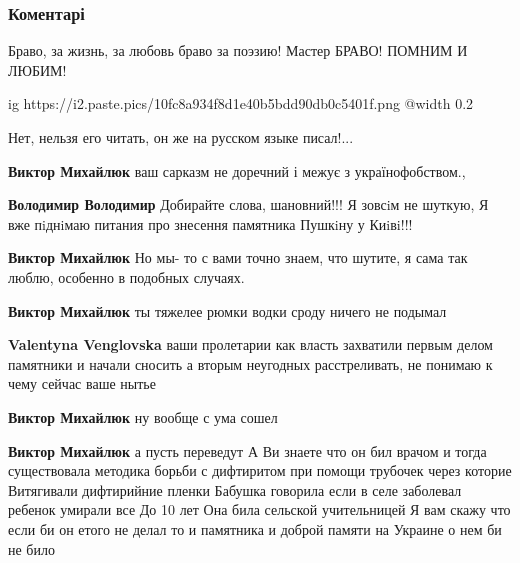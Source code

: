  
 
 
 
 
\subsubsection{Коментарі}

\begin{itemize} %
Браво, за жизнь, за любовь браво за поэзию! Мастер БРАВО! ПОМНИМ И ЛЮБИМ!

\ifcmt
  ig https://i2.paste.pics/10fc8a934f8d1e40b5bdd90db0c5401f.png
  @width 0.2
\fi

Нет, нельзя его читать, он же на русском языке писал!...

\begin{itemize} %
\textbf{Виктор Михайлюк} ваш сарказм не доречний і межує з українофобством.,

\begin{itemize} %
\textbf{Володимир Володимир} Добирайте слова, шановний!!! Я зовсiм не шуткую, Я вже пiднiмаю питания про знесення памятника Пушкiну у Киiвi!!!

\textbf{Виктор Михайлюк} Но мы- то с вами точно знаем, что шутите, я сама так люблю, особенно в подобных случаях.

\textbf{Виктор Михайлюк} ты тяжелее рюмки водки сроду ничего не подымал

\textbf{Valentyna Venglovska} ваши пролетарии как власть захватили первым делом памятники и начали сносить а вторым неугодных расстреливать, не понимаю к чему сейчас ваше нытье

\textbf{Виктор Михайлюк} ну вообще с ума сошел
\end{itemize} %

\textbf{Виктор Михайлюк} а пусть переведут
А Ви знаете что он бил врачом и тогда существовала методика борьби с дифтиритом при помощи трубочек через которие
Витягивали дифтирийние пленки
Бабушка говорила если в селе заболевал ребенок умирали все
До 10 лет
Она била сельской учительницей
Я вам скажу что если би он етого не делал то и памятника и доброй памяти на Украине о нем би не било


\end{itemize}
\end{itemize}
